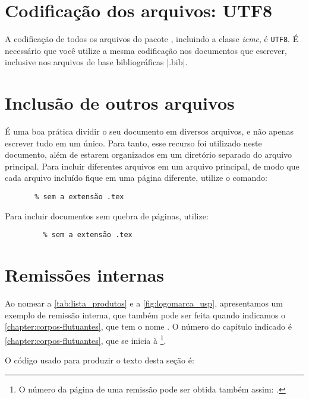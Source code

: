 \section{Codificação dos arquivos: UTF8}

A codificação de todos os arquivos do pacote \abnTeX, incluindo a classe \textit{icmc}, é \texttt{UTF8}. É necessário que
você utilize a mesma codificação nos documentos que escrever, inclusive nos
arquivos de base bibliográficas |.bib|.



\section{Inclusão de outros arquivos}\label{sec-include}

É uma boa prática dividir o seu documento em diversos arquivos, e não
apenas escrever tudo em um único. Para tanto, esse recurso foi utilizado neste
documento, além de estarem organizados em um diretório separado do arquivo principal. Para incluir diferentes arquivos em um arquivo principal,
de modo que cada arquivo incluído fique em uma página diferente, utilize o
comando:

\begin{verbatim}
       % sem a extensão .tex
\end{verbatim}

Para incluir documentos sem quebra de páginas, utilize:

\begin{verbatim}
         % sem a extensão .tex
\end{verbatim}



\section{Remissões internas}

Ao nomear a \autoref{tab:lista_produtos} e a \autoref{fig:logomarca_usp}, apresentamos um exemplo de remissão interna, que também pode ser feita quando indicamos o \autoref{chapter:corpos-flutuantes}, que tem o nome \emph{}. O número do capítulo indicado é \ref{chapter:corpos-flutuantes}, que se inicia à \footnote{O número da página de uma remissão pode ser obtida também assim:
\pageref{chapter:corpos-flutuantes}.}.

O código usado para produzir o texto desta seção é:

